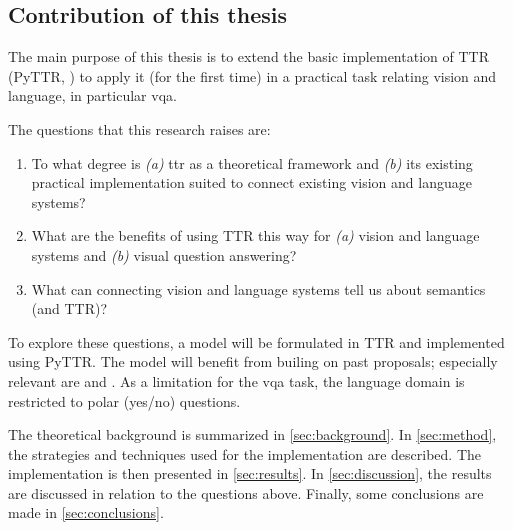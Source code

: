 \subsection{Contribution of this thesis}
\label{sec:contribution}

The main purpose of this thesis is to extend the basic implementation of TTR (PyTTR, \cite{pyttr}) to apply it (for the first time) in a practical task relating vision and language, in particular \acrfull{vqa}.

The questions that this research raises are:

\begin{enumerate}
\item To what degree is \textit{(a)} \gls{ttr} as a theoretical framework and \textit{(b)} its existing practical implementation suited to connect existing vision and language systems?
\item What are the benefits of using TTR this way for \textit{(a)} vision and language systems and \textit{(b)} visual question answering?
\item What can connecting vision and language systems tell us about semantics (and TTR)?
\end{enumerate}

To explore these questions, a model will be formulated in TTR and implemented using PyTTR.
The model will benefit from builing on past proposals; especially relevant are \cite{ttrspat} and \cite{lspc}.
As a limitation for the \gls{vqa} task, the language domain is restricted to polar (yes/no) questions.


The theoretical background is summarized in \autoref{sec:background}.
In \autoref{sec:method}, the strategies and techniques used for the implementation are described.
The implementation is then presented in \autoref{sec:results}.
In \autoref{sec:discussion}, the results are discussed in relation to the questions above.
Finally, some conclusions are made in \autoref{sec:conclusions}.
